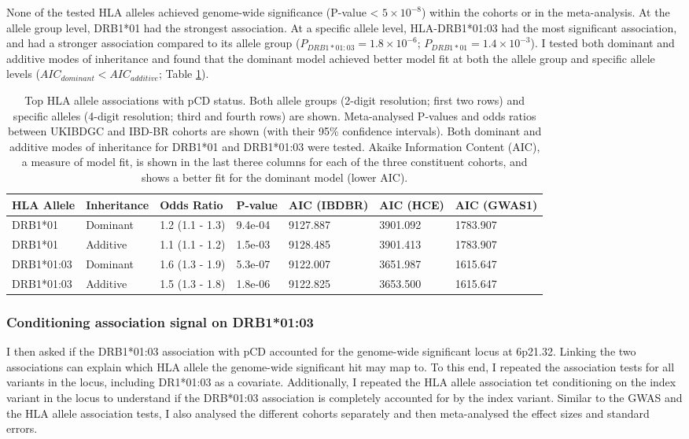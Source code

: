 None of the tested HLA alleles achieved genome-wide significance (P-value < $5\times10^{-8}$) within the cohorts or in the meta-analysis. At the allele group level, DRB1*01 had the strongest association. At a specific allele level, HLA-DRB1*01:03 had the most significant association, and had a stronger association compared to its allele group ($P_{DRB1*01:03}=1.8\times10^{-6}$; $P_{DRB1*01}=1.4\times10^{-3}$). I tested both dominant and additive modes of inheritance and found that the dominant model achieved better model fit at both the allele group and specific allele levels ($AIC_{dominant} < AIC_{additive}$; Table \ref{table:hla_allele_assoc}). 
\begin{table}[H]
  
  \centering\begingroup\fontsize{9}{10}\selectfont
  \caption{Top HLA allele associations with pCD status. Both allele groups (2-digit resolution; first two rows) and specific alleles (4-digit resolution; third and fourth rows) are shown. Meta-analysed P-values and odds ratios between UKIBDGC and IBD-BR cohorts are shown (with their 95\% confidence intervals). Both dominant and additive modes of inheritance  for  DRB1*01 and DRB1*01:03 were tested. Akaike Information Content (AIC), a measure of model fit, is shown in the last theree columns for each of the three constituent cohorts, and shows a better fit for the dominant model (lower AIC).}
  \label{table:hla_allele_assoc}
  \begin{tabular}[t]{|l|l|l|l|l|l|l|}
  \hline
  HLA Allele & Inheritance & Odds Ratio & P-value & AIC (IBDBR) & AIC (HCE) & AIC (GWAS1)\\
  \hline
  DRB1*01 & Dominant & 1.2 (1.1 - 1.3) & 9.4e-04 & 9127.887 & 3901.092 & 1783.907\\
  \hline
  DRB1*01 & Additive & 1.1 (1.1 - 1.2) & 1.5e-03 & 9128.485 & 3901.413 & 1783.907\\
  \hline
  DRB1*01:03 & Dominant & 1.6 (1.3 - 1.9) & 5.3e-07 & 9122.007 & 3651.987 & 1615.647\\
\hline
DRB1*01:03 & Additive & 1.5 (1.3 - 1.8) & 1.8e-06 & 9122.825 & 3653.500 & 1615.647\\
\hline
  \end{tabular}
  \endgroup{}
  \end{table}
\subsubsection{Conditioning association signal on DRB1*01:03}
I then asked if the DRB1*01:03 association with pCD accounted for the genome-wide significant locus at 6p21.32. Linking the two associations can explain which HLA allele the genome-wide significant hit may map to. To this end, I repeated the association tests for all variants in the locus, including DR1*01:03 as a covariate. Additionally, I repeated the HLA allele association tet conditioning on the index variant in the locus to understand if the DRB*01:03 association is completely accounted for by the index variant. Similar to the GWAS and the HLA allele association tests, I also analysed the different cohorts separately and then meta-analysed the effect sizes and standard errors.\\


